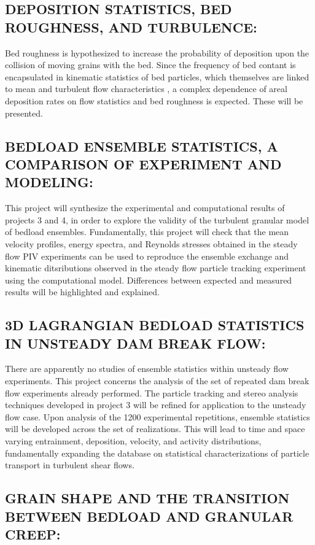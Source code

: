 \subsection{DEPOSITION STATISTICS, BED ROUGHNESS, AND TURBULENCE: }

Bed roughness is hypothesized to increase the probability of deposition upon the collision of moving grains with the bed. Since the frequency of bed contant is encapsulated in kinematic statistics of bed particles, which themselves are linked to mean and turbulent flow characteristics \cite{Bialik2012}, a complex dependence of areal deposition rates on flow statistics and bed roughness is expected. These will be presented. 
\bigskip 

\subsection{BEDLOAD ENSEMBLE STATISTICS, A COMPARISON OF EXPERIMENT AND MODELING: }

This project will synthesize the experimental and computational results of projects 3 and 4, in order to explore the validity of the turbulent granular model of bedload ensembles. Fundamentally, this project will check that the mean velocity profiles, energy spectra, and Reynolds stresses obtained in the steady flow PIV experiments can be used to reproduce the ensemble exchange and kinematic ditsributions observed in the steady flow particle tracking experiment using the computational model. Differences between expected and measured results will be highlighted and explained. 
\bigskip 

\subsection{3D LAGRANGIAN BEDLOAD STATISTICS IN UNSTEADY DAM BREAK FLOW:}

There are apparently no studies of ensemble statistics within unsteady flow experiments. This project concerns the analysis of the set of repeated dam break flow experiments already performed. The particle tracking and stereo analysis techniques developed in project 3 will be refined for application to the unsteady flow case. Upon analysis of the 1200 experimental repetitions, ensemble statistics will be developed across the set of realizations. This will lead to time and space varying entrainment, deposition, velocity, and activity distributions, fundamentally expanding the database on statistical characterizations of particle transport in turbulent shear flows. 

\subsection{GRAIN SHAPE AND THE TRANSITION BETWEEN BEDLOAD AND GRANULAR CREEP:}




